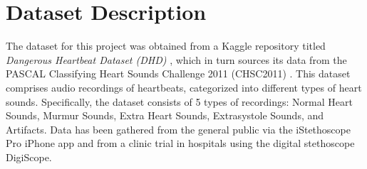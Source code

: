 \section{Dataset Description}

The dataset for this project was obtained from a Kaggle repository titled \textit{Dangerous Heartbeat Dataset (DHD)} \cite{Dangerous-Heartbeat-Dataset-DHD}, 
which in turn sources its data from the PASCAL Classifying Heart Sounds Challenge 2011 (CHSC2011) \cite{pascal-chsc-2011}. 
This dataset comprises audio recordings of heartbeats, categorized into different types of heart sounds.
Specifically, the dataset consists of 5 types of recordings: Normal Heart Sounds, Murmur Sounds, Extra Heart Sounds, Extrasystole Sounds, and Artifacts.
Data has been gathered from the general public via the iStethoscope Pro iPhone app and from a clinic trial in hospitals using the digital stethoscope DigiScope.
